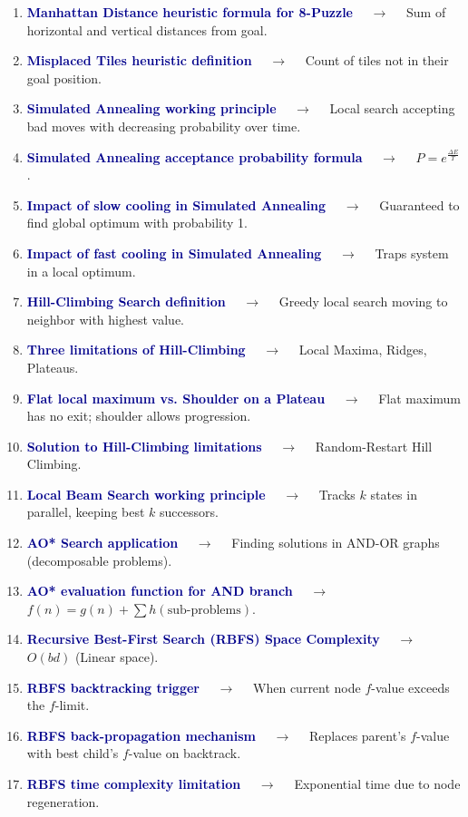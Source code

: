 \documentclass[11pt,a4paper]{article}
\begin{document}
\begin{enumerate}[label=\arabic*., leftmargin=*, labelsep=0.8em, itemsep=0.35em, parsep=0.1em, topsep=0.2em]
  \item \textcolor{darkblue}{\textbf{Manhattan Distance heuristic formula for 8-Puzzle}} $\quad\to\quad$ Sum of horizontal and vertical distances from goal.
  \item \textcolor{darkblue}{\textbf{Misplaced Tiles heuristic definition}} $\quad\to\quad$ Count of tiles not in their goal position.
  \item \textcolor{darkblue}{\textbf{Simulated Annealing working principle}} $\quad\to\quad$ Local search accepting bad moves with decreasing probability over time.
  \item \textcolor{darkblue}{\textbf{Simulated Annealing acceptance probability formula}} $\quad\to\quad$ $P = e^{\frac{\Delta E}{T}}$.
  \item \textcolor{darkblue}{\textbf{Impact of slow cooling in Simulated Annealing}} $\quad\to\quad$ Guaranteed to find global optimum with probability 1.
  \item \textcolor{darkblue}{\textbf{Impact of fast cooling in Simulated Annealing}} $\quad\to\quad$ Traps system in a local optimum.
  \item \textcolor{darkblue}{\textbf{Hill-Climbing Search definition}} $\quad\to\quad$ Greedy local search moving to neighbor with highest value.
  \item \textcolor{darkblue}{\textbf{Three limitations of Hill-Climbing}} $\quad\to\quad$ Local Maxima, Ridges, Plateaus.
  \item \textcolor{darkblue}{\textbf{Flat local maximum vs. Shoulder on a Plateau}} $\quad\to\quad$ Flat maximum has no exit; shoulder allows progression.
  \item \textcolor{darkblue}{\textbf{Solution to Hill-Climbing limitations}} $\quad\to\quad$ Random-Restart Hill Climbing.
  \item \textcolor{darkblue}{\textbf{Local Beam Search working principle}} $\quad\to\quad$ Tracks $k$ states in parallel, keeping best $k$ successors.
  \item \textcolor{darkblue}{\textbf{AO* Search application}} $\quad\to\quad$ Finding solutions in AND-OR graphs (decomposable problems).
  \item \textcolor{darkblue}{\textbf{AO* evaluation function for AND branch}} $\quad\to\quad$ $f(n) = g(n) + \sum h(\text{sub-problems})$.
  \item \textcolor{darkblue}{\textbf{Recursive Best-First Search (RBFS) Space Complexity}} $\quad\to\quad$ $O(bd)$ (Linear space).
  \item \textcolor{darkblue}{\textbf{RBFS backtracking trigger}} $\quad\to\quad$ When current node $f$-value exceeds the $f$-limit.
  \item \textcolor{darkblue}{\textbf{RBFS back-propagation mechanism}} $\quad\to\quad$ Replaces parent's $f$-value with best child's $f$-value on backtrack.
  \item \textcolor{darkblue}{\textbf{RBFS time complexity limitation}} $\quad\to\quad$ Exponential time due to node regeneration.
\end{enumerate}
\end{document}
